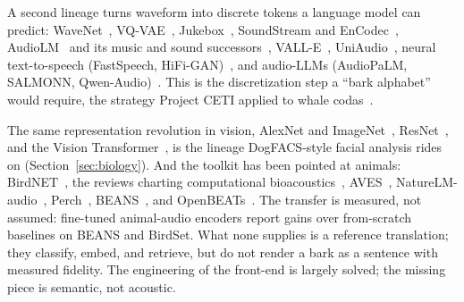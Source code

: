 A second lineage turns waveform into discrete tokens a language model can
predict: WaveNet~\cite{vandenoord2016wavenet},
VQ-VAE~\cite{vandenoord2017vqvae}, Jukebox~\cite{dhariwal2020jukebox},
SoundStream and EnCodec~\cite{zeghidour2021soundstream,defossez2022encodec},
AudioLM~\cite{borsos2023audiolm} and its music and sound
successors~\cite{agostinelli2023musiclm,copet2023musicgen,kreuk2023audiogen},
VALL-E~\cite{wang2023valle}, UniAudio~\cite{yang2024uniaudio}, neural
text-to-speech (FastSpeech, HiFi-GAN)~\cite{ren2019fastspeech,kong2020hifigan},
and audio-LLMs
(AudioPaLM, SALMONN, Qwen-Audio)~\cite{rubenstein2023audiopalm,tang2024salmonn,chu2024qwenaudio}.
This is the discretization step a ``bark alphabet'' would require, the
strategy Project CETI applied to whale codas~\cite{sharma2024whale}.

The same representation revolution in vision, AlexNet and
ImageNet~\cite{krizhevsky2012alexnet,deng2009imagenet,russakovsky2015imagenet},
ResNet~\cite{he2016resnet}, and the Vision
Transformer~\cite{dosovitskiy2021vit}, is the lineage DogFACS-style facial
analysis rides on (Section~\ref{sec:biology}). And the toolkit has been
pointed at animals: BirdNET~\cite{kahl2021birdnet}, the reviews charting
computational bioacoustics~\cite{stowell2022review,stowell2014automatic},
AVES~\cite{hagiwara2023aves}, NatureLM-audio~\cite{robinson2024naturelm},
Perch~\cite{ghani2023perch}, BEANS~\cite{hagiwara2023beans}, and
OpenBEATs~\cite{openbeats2025}. The transfer is measured, not assumed:
fine-tuned animal-audio encoders report gains over from-scratch baselines on
BEANS and BirdSet. What none supplies is a reference translation; they
classify, embed, and retrieve, but do not render a bark as a sentence with
measured fidelity. The engineering of the front-end is largely solved; the
missing piece is semantic, not acoustic.

